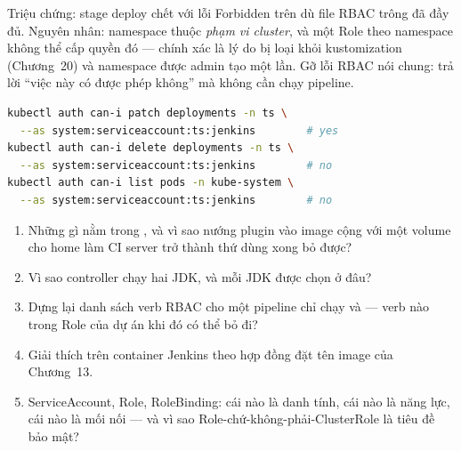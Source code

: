 \begin{pitfall}
Triệu chứng: stage deploy chết với lỗi Forbidden trên
 dù file RBAC trông đã đầy đủ. Nguyên nhân: namespace
thuộc \emph{phạm vi cluster}, và một Role theo namespace không thể cấp
quyền đó --- chính xác là lý do  bị loại khỏi
kustomization (Chương~20) và namespace được admin tạo một lần. Gỡ lỗi
RBAC nói chung:
 trả lời ``việc này có được phép
không'' mà không cần chạy pipeline.
\end{pitfall}

\begin{handson}
\begin{lstlisting}[language=bash]
kubectl auth can-i patch deployments -n ts \
  --as system:serviceaccount:ts:jenkins        # yes
kubectl auth can-i delete deployments -n ts \
  --as system:serviceaccount:ts:jenkins        # no
kubectl auth can-i list pods -n kube-system \
  --as system:serviceaccount:ts:jenkins        # no
\end{lstlisting}
\end{handson}

\begin{quiz}
\begin{enumerate}
  \item Những gì nằm trong , và vì sao nướng
  plugin vào image cộng với một volume cho home làm CI server trở
  thành thứ dùng xong bỏ được?
  \item Vì sao controller chạy hai JDK, và mỗi JDK được chọn ở đâu?
  \item Dựng lại danh sách verb RBAC cho một pipeline chỉ chạy
  \code{kubectl apply -k} và  --- verb nào trong
  Role của dự án khi đó có thể bỏ đi?
  \item Giải thích \code{--network host} trên container Jenkins theo
  hợp đồng đặt tên image của Chương~13.
  \item ServiceAccount, Role, RoleBinding: cái nào là danh tính, cái
  nào là năng lực, cái nào là mối nối --- và vì sao
  Role-chứ-không-phải-ClusterRole là tiêu đề bảo mật?
\end{enumerate}
\end{quiz}
